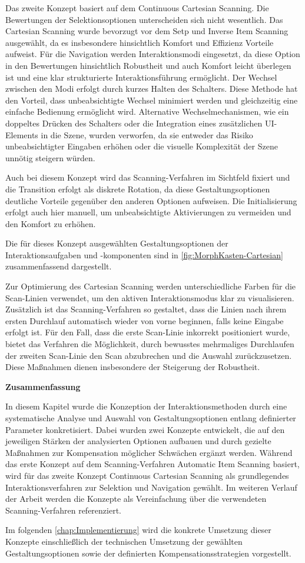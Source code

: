 Das zweite Konzept basiert auf dem Continuous Cartesian Scanning. Die Bewertungen der Selektionsoptionen unterscheiden sich nicht wesentlich. Das Cartesian Scanning wurde bevorzugt vor dem Setp und Inverse Item Scanning ausgewählt, da es insbesondere hinsichtlich Komfort und Effizienz Vorteile aufweist. Für die Navigation werden Interaktionsmodi eingesetzt, da diese Option in den Bewertungen hinsichtlich Robustheit und auch Komfort leicht überlegen ist und eine klar strukturierte Interaktionsführung ermöglicht.
Der Wechsel zwischen den Modi erfolgt durch kurzes Halten des Schalters. Diese Methode hat den Vorteil, dass unbeabsichtigte Wechsel minimiert werden und gleichzeitig eine einfache Bedienung ermöglicht wird. Alternative Wechselmechanismen, wie ein doppeltes Drücken des Schalters oder die Integration eines zusätzlichen UI-Elements in die Szene, wurden verworfen, da sie entweder das Risiko unbeabsichtigter Eingaben erhöhen oder die visuelle Komplexität der Szene unnötig steigern würden.

Auch bei diesem Konzept wird das Scanning-Verfahren im Sichtfeld fixiert und die Transition erfolgt als diskrete Rotation, da diese Gestaltungsoptionen deutliche Vorteile gegenüber den anderen Optionen aufweisen. Die Initialisierung erfolgt auch hier manuell, um unbeabsichtigte Aktivierungen zu vermeiden und den Komfort zu erhöhen.

Die für dieses Konzept ausgewählten Gestaltungsoptionen der Interaktionsaufgaben und -komponenten sind in \autoref{fig:MorphKasten-Cartesian} zusammenfassend dargestellt.

Zur Optimierung des Cartesian Scanning werden unterschiedliche Farben für die Scan-Linien verwendet, um den aktiven Interaktionsmodus klar zu visualisieren. Zusätzlich ist das Scanning-Verfahren so gestaltet, dass die Linien nach ihrem ersten Durchlauf automatisch wieder von vorne beginnen, falls keine Eingabe erfolgt ist. Für den Fall, dass die erste Scan-Linie inkorrekt positioniert wurde, bietet das Verfahren die Möglichkeit, durch bewusstes mehrmaliges Durchlaufen der zweiten Scan-Linie den Scan abzubrechen und die Auswahl zurückzusetzen. Diese Maßnahmen dienen insbesondere der Steigerung der Robustheit.

{\normalfont \bfseries Zusammenfassung}

In diesem Kapitel wurde die Konzeption der Interaktionsmethoden durch eine systematische Analyse und Auswahl von Gestaltungsoptionen entlang definierter Parameter konkretisiert. Dabei wurden zwei Konzepte entwickelt, die auf den jeweiligen Stärken der analysierten Optionen aufbauen und durch gezielte Maßnahmen zur Kompensation möglicher Schwächen ergänzt werden. Während das erste Konzept auf dem Scanning-Verfahren Automatic Item Scanning basiert, wird für das zweite Konzept Continuous Cartesian Scanning als grundlegendes Interaktionsverfahren zur Selektion und Navigation gewählt. Im weiteren Verlauf der Arbeit werden die Konzepte als Vereinfachung über die verwendeten Scanning-Verfahren referenziert. 

Im folgenden \autoref{chap:Implementierung} wird die konkrete Umsetzung dieser Konzepte einschließlich der technischen Umsetzung der gewählten Gestaltungsoptionen sowie der definierten Kompensationsstrategien vorgestellt.